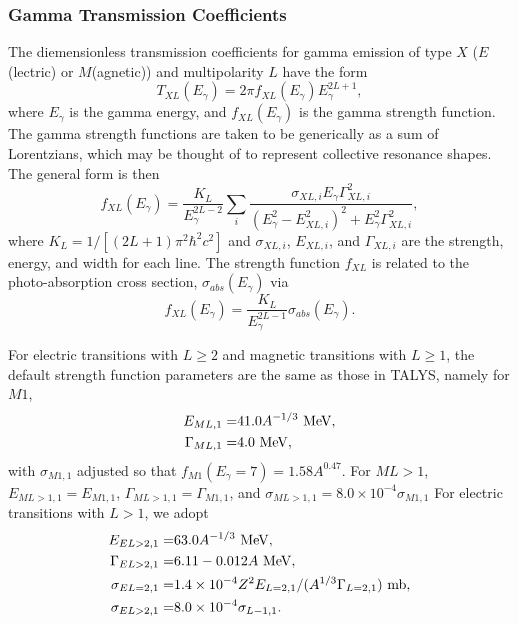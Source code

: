 \documentclass[
10pt,
showpacs,preprintnumbers,footinbib,
amsfonts,amsmath,amssymb,
aps,
prc,twocolumn,groupedaddress,superscriptaddress,
showkeys,
nofootinbib
]{revtex4-1}
\begin{document}
\subsubsection{Gamma Transmission Coefficients}

The diemensionless transmission coefficients for gamma emission of type $X$ ($E$(lectric) or $M$(agnetic)) and multipolarity $L$ have the form
\begin{equation}
T_{XL}(E_\gamma) = 2\pi f_{XL}(E_\gamma)E_\gamma^{2L+1},
\end{equation}
where $E_\gamma$ is the gamma energy, and $f_{XL}(E_\gamma)$ is the gamma strength function. The gamma strength functions are taken to be generically as a sum of Lorentzians, which may be thought of to represent collective resonance shapes. The general form is then
\begin{equation}
f_{XL}(E_\gamma ) = \frac{K_L}{E_\gamma^{2L-2} }\sum_i \frac{\sigma_{XL,i} E_\gamma\Gamma^2_{XL,i}}{(E_\gamma^2 - E^2_{XL,i})^2+E^2_\gamma\Gamma^2_{XL,i}},
\label{eq:Lor}
\end{equation} 
where $K_L = 1/[(2L+1)\pi^2\hbar^2c^2]$ and $\sigma_{XL,i}$, $E_{XL,i}$, and $\Gamma_{XL,i}$ are the strength, energy, and width for each line.  The strength function $f_{XL}$ is related to the photo-absorption cross section, $\sigma_{abs}(E_\gamma)$ via
\begin{equation}
f_{XL}(E_\gamma) = \frac{K_L}{E_\gamma^{2L-1}}  \sigma_{abs}(E_\gamma).
\end{equation}

For electric transitions with $L \ge 2$ and magnetic transitions with $L \ge 1$, the default strength function parameters are the same as those in TALYS, namely for $M1$,
\begin{align}
E_{ML,1} =  & 41.0A^{-1/3}~{\rm MeV},\notag\\
\Gamma_{ML,1} = & 4.0~{\rm MeV},
\end{align}
with $\sigma_{M1,1}$ adjusted so that $f_{M1}(E_\gamma = 7) = 1.58A^{0.47}$. For $ML>1$, $E_{ML>1,1} = E_{M1,1}$, $\Gamma_{ML>1,1} = \Gamma_{M1,1}$, and $\sigma_{ML>1,1} = 8.0\times 10^{-4}\sigma_{M1,1}$
 For electric transitions with $L > 1$, we adopt
\begin{align}
E_{EL>2,1} =  & 63.0A^{-1/3}~{\rm MeV},\notag\\
\Gamma_{EL>2,1} = & 6.11 - 0.012A~{\rm MeV},\notag\\
\sigma_{EL=2,1}= & 1.4\times 10^{-4}Z^2E_{L=2,1}/(A^{1/3}\Gamma_{L=2,1})~{\rm mb},\notag\\
\sigma_{EL>2,1}= & 8.0\times 10^{-4}\sigma_{L-1,1}.
\end{align}
\end{document}

